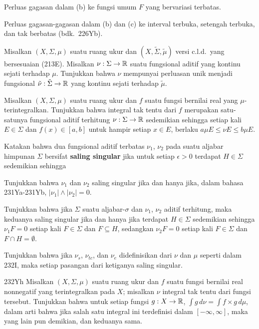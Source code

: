 { Perluas gagasan dalam (b) ke fungsi umum $F$
yang bervariasi terbatas.

 Perluas gagasan-gagasan dalam (b) dan (c) ke
interval terbuka, setengah terbuka, dan tak berbatas (bdk.\ 226Yb).

 Misalkan $(X,\Sigma,\mu)$ suatu ruang ukur dan
$(X,\tilde\Sigma,\tilde\mu)$ versi c.l.d.\ yang bersesuaian (213E).
Misalkan
$\nu:\Sigma\to\Bbb R$ suatu fungsional aditif yang kontinu sejati
terhadap $\mu$. Tunjukkan bahwa $\nu$ mempunyai perluasan unik menjadi
fungsional $\tilde\nu:\tilde\Sigma\to\Bbb R$ yang kontinu sejati
terhadap $\tilde\mu$.

 Misalkan $(X,\Sigma,\mu)$ suatu ruang ukur dan
$f$ suatu fungsi bernilai real yang $\mu$-terintegralkan. Tunjukkan bahwa
integral tak tentu dari $f$ merupakan satu-satunya fungsional aditif
terhitung $\nu:\Sigma\to\Bbb R$ sedemikian sehingga setiap kali
$E\in\Sigma$ dan $f(x)\in[a,b]$ untuk hampir setiap $x\in E$, berlaku
$a\mu E\le\nu E\le b\mu E$.

 Katakan bahwa dua fungsional aditif terbatas
$\nu_1$, $\nu_2$ pada suatu aljabar himpunan $\Sigma$ bersifat
{\bf saling singular} jika untuk setiap $\epsilon>0$ terdapat
$H\in\Sigma$ sedemikian sehingga



 Tunjukkan bahwa $\nu_1$ dan $\nu_2$ saling singular jika dan
hanya jika, dalam bahasa 231Ya-231Yb, $|\nu_1|\wedge|\nu_2|=0$.

 Tunjukkan bahwa jika $\Sigma$ suatu aljabar-$\sigma$ dan
$\nu_1$, $\nu_2$ aditif terhitung, maka keduanya saling singular jika
dan hanya jika terdapat $H\in\Sigma$ sedemikian sehingga $\nu_1F=0$
setiap kali $F\in\Sigma$ dan $F\subseteq H$, sedangkan $\nu_2F=0$
setiap kali $F\in\Sigma$ dan $F\cap H=\emptyset$.

 Tunjukkan bahwa jika $\nu_s$, $\nu_{tc}$, dan $\nu_e$
didefinisikan dari $\nu$ dan $\mu$ seperti dalam 232I, maka setiap
pasangan dari ketiganya saling singular.

\spheader 232Yh Misalkan $(X,\Sigma,\mu)$ suatu ruang ukur dan $f$ suatu
fungsi bernilai real nonnegatif yang terintegralkan pada $X$; misalkan
$\nu$ integral tak tentu dari fungsi tersebut. Tunjukkan bahwa untuk setiap fungsi
$g:X\to\Bbb R$, $\int g\,d\nu=\int f\times g\,d\mu$, dalam arti bahwa
jika salah satu integral ini terdefinisi dalam $[-\infty,\infty]$, maka
yang lain pun demikian, dan keduanya sama. 

}
